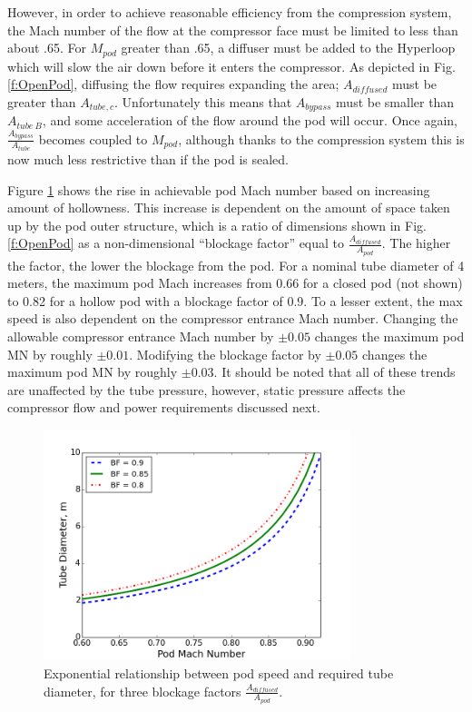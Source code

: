 \documentclass[heading.tex]{subfiles}
\begin{document}
However, in order to achieve reasonable efficiency from the compression system, the Mach number of the flow at the compressor face
must be limited to less than about .65. For $M_{pod}$ greater than .65, a diffuser must be added to the Hyperloop 
which will slow the air down before it enters the compressor. As depicted in Fig. \ref{f:OpenPod}, diffusing the flow 
requires expanding the area; $A_{diffused}$ must be greater than $A_{tube,c}$. Unfortunately this means that
$A_{bypass}$ must be smaller than $A_{tube\ B}$, and some acceleration of the flow around the pod will occur.
Once again, $\frac{A_{bypass}}{A_{tube}}$ becomes coupled to $M_{pod}$, although thanks to the compression 
system this is now much less restrictive than if the pod is sealed. 

Figure \ref{f:machRAD} shows the rise in achievable pod Mach number based on increasing amount of hollowness.
This increase is dependent on the amount of space taken up by the pod outer structure,
which is a ratio of dimensions shown in Fig. \ref{f:OpenPod}
as a non-dimensional ``blockage factor'' equal to $\frac{A_{diffused}}{A_{pod}}$.
The higher the factor, the lower the blockage from the pod.
For a nominal tube diameter of 4 meters, the maximum pod Mach increases from 0.66 for a closed pod (not shown)
to 0.82 for a hollow pod with a blockage factor of 0.9.
To a lesser extent, the max speed is also dependent on the compressor entrance Mach number.
Changing the allowable compressor entrance Mach number by $\pm 0.05$ changes the maximum pod MN by roughly $\pm 0.01$. 
Modifying the blockage factor by $\pm 0.05$ changes the maximum pod MN by roughly $\pm 0.03$.
It should be noted that all of these trends are unaffected by the tube pressure,
however, static pressure affects the compressor flow and power requirements discussed next.


\begin{figure}[H]
\centering
\includegraphics[width=0.8\textwidth]{images/mach_vs_rad6.png}
\caption[Tube and Pod Radius vs Mach]{Exponential relationship between pod speed and required tube diameter, for three blockage factors $\frac{A_{diffused}}{A_{pod}}$.}
\label{f:machRAD}
\end{figure}
\end{document}
